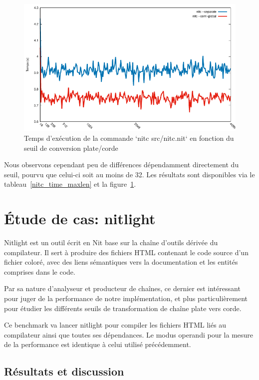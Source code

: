 \begin{figure}
	\caption{Temps d'exécution de la commande `nitc src/nitc.nit` en fonction du seuil de conversion plate/corde}
	\label{nitc_sep_maxlen}
	\centering
	\includegraphics[]{figures/nitc_separate_maxlen.pdf}
\end{figure}

Nous observons cependant peu de différences dépendamment directement du seuil, pourvu que celui-ci
soit au moins de 32.
Les résultats sont disponibles via le tableau~\ref{nitc_time_maxlen} et la figure~\ref{nitc_sep_maxlen}.

\section{Étude de cas: nitlight}

Nitlight est un outil écrit en Nit base sur la chaîne d'outils dérivée du
compilateur.
Il sert à produire des fichiers HTML contenant le code source d'un fichier
coloré, avec des liens sémantiques vers la documentation et les entités
comprises dans le code.

Par sa nature d'analyseur et producteur de chaînes, ce dernier est intéressant
pour juger de la performance de notre implémentation, et plus particulièrement
pour étudier les différents seuils de transformation de chaîne plate vers corde.

Ce benchmark va lancer nitlight pour compiler les fichiers HTML liés au compilateur
ainsi que toutes ses dépendances.
Le modus operandi pour la mesure de la performance est identique à celui
utilisé précédemment.

\subsection{Résultats et discussion}

